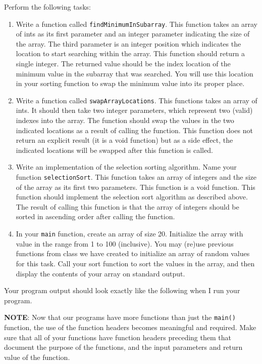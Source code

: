 \documentclass[11pt]{article}
\begin{document}
Perform the following tasks:

\begin{enumerate}
\item Write a function called \verb~findMinimumInSubarray~.  This function
   takes an array of ints as its first parameter and an integer
   parameter indicating the size of the array.  The third parameter is
   an integer position which indicates the location to start searching
   within the array.  This function should return a single integer.
   The returned value should be the index location of the minimum
   value in the subarray that was searched.  You will use this
   location in your sorting function to swap the minimum value into
   its proper place.
\item Write a function called \verb~swapArrayLocations~.  This functions takes
   an array of ints.  It should then take two integer parameters,
   which represent two (valid) indexes into the array.  The function
   should swap the values in the two indicated locations as a result
   of calling the function.  This function does not return an explicit
   result (it is a void function) but as a side effect, the indicated
   locations will be swapped after this function is called.
\item Write an implementation of the selection sorting algorithm.  Name
   your function \verb~selectionSort~.  This function takes an array of
   integers and the size of the array as its first two parameters.
   This function is a void function.  This function should implement
   the selection sort algorithm as described above.  The result of
   calling this function is that the array of integers should be
   sorted in ascending order after calling the function.
\item In your \verb~main~ function, create an array of size 20.  Initialize
   the array with value in the range from 1 to 100 (inclusive).  You
   may (re)use previous functions from class we have created to
   initialize an array of random values for this task.  Call your
   sort function to sort the values in the array, and then display the contents of 
   your array on standard output.
\end{enumerate}

Your program output should look exactly like the following when I run
your program. 



\textbf{NOTE}: Now that our programs have more functions than just the
\verb~main()~ function, the use of the function headers becomes meaningful
and required.  Make sure that all of your functions have function
headers preceding them that document the purpose of the functions, and
the input parameters and return value of the function.
\end{document}

